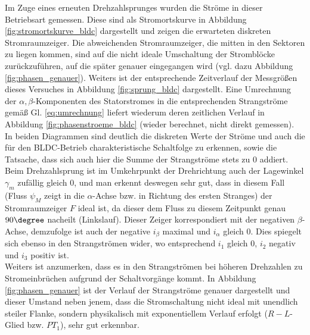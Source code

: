 \noindent Im Zuge eines erneuten Drehzahlsprunges wurden die Ströme in dieser Betriebsart gemessen. Diese sind als Stromortskurve in Abbildung \ref{fig:stromortskurve_bldc} dargestellt und zeigen die erwarteten diskreten Stromraumzeiger. Die abweichenden Stromraumzeiger, die mitten in den Sektoren zu liegen kommen, sind auf die nicht ideale Umschaltung der Stromblöcke zurückzuführen, auf die später genauer eingegangen wird (vgl. dazu Abbildung \ref{fig:phasen_genauer}).
\noindent Weiters ist der entsprechende Zeitverlauf der Messgrößen dieses Versuches in Abbildung \ref{fig:sprung_bldc} dargestellt. Eine Umrechnung der $\alpha, \beta$-Komponenten des Statorstromes in die entsprechenden Strangströme gemäß Gl. \ref{eq:umrechnung} liefert wiederum deren zeitlichen Verlauf in Abbildung \ref{fig:phasenstroeme_bldc} (wieder berechnet, nicht direkt gemessen).\\
In beiden Diagrammen sind deutlich die diskreten Werte der Ströme und auch die für den BLDC-Betrieb charakteristische Schaltfolge zu erkennen, sowie die Tatsache, dass sich auch hier die Summe der Strangströme stets zu 0 addiert.\\
Beim Drehzahlsprung ist im Umkehrpunkt der Drehrichtung auch der Lagewinkel $\gamma_m$ zufällig gleich 0, und man erkennt deswegen sehr gut, dass in diesem Fall (Fluss $\psi_M$ zeigt in die $\alpha$-Achse bzw. in Richtung des ersten Stranges) der Stromraumzeiger $F$ ideal ist, da dieser dem Fluss zu diesem Zeitpunkt genau $90\degree$ nacheilt (Linkslauf). Dieser Zeiger korrespondiert mit der negativen $\beta$-Achse, demzufolge ist auch der negative $i_{\beta}$ maximal und $i_{\alpha}$ gleich 0. Dies spiegelt sich ebenso in den Strangströmen wider, wo entsprechend $i_1$ gleich 0, $i_2$ negativ und $i_3$ positiv ist.\\
Weiters ist anzumerken, dass es in den Strangströmen bei höheren Drehzahlen zu Stromeinbrüchen aufgrund der Schaltvorgänge kommt. In Abbildung \ref{fig:phasen_genauer} ist der Verlauf der Strangströme genauer dargestellt und dieser Umstand neben jenem, dass die Stromschaltung nicht ideal mit unendlich steiler Flanke, sondern physikalisch mit exponentiellem Verlauf erfolgt ($R-L$-Glied bzw. $PT_1$), sehr gut erkennbar.\\

